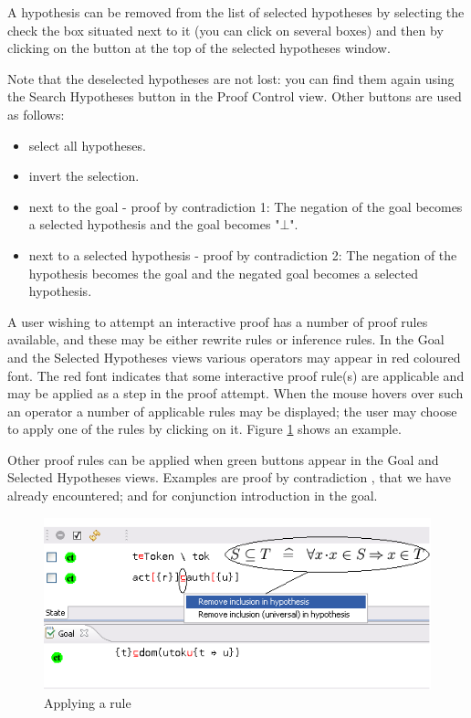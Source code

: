 A hypothesis can be removed from the list of selected hypotheses by selecting the check the box situated next to it (you can click on several boxes) and then by clicking on the  button at the top of the selected hypotheses window.

Note that the deselected hypotheses are not lost: you can find them again using the \textsf{Search Hypotheses}  button in the Proof Control view. Other buttons are used as follows:

\begin{itemize}
	\item {} select all hypotheses. 
	\item {} invert the selection. 
	\item {} next to the goal - proof by contradiction 1: The negation of the goal becomes a selected hypothesis and the goal becomes "$\bot$". 
	\item {} next to a selected hypothesis - proof by contradiction 2: The negation of the hypothesis becomes the goal and the negated goal becomes a selected hypothesis. 
\end{itemize}

A user wishing to attempt an interactive proof has a number of proof rules available, and these may be either rewrite rules or inference rules. In the \textsf{Goal} and the \textsf{Selected Hypotheses} views various operators may appear in red coloured font. The red font indicates that some interactive proof rule(s) are applicable and may be applied as a step in the proof attempt. When the mouse hovers over such an operator a number of applicable rules may be displayed; the user may choose to apply one of the rules by clicking on it. Figure \ref{fig_ref_01_proving_perspective4} shows an example.

Other proof rules can be applied when green buttons appear in the \textsf{Goal} and \textsf{Selected Hypotheses} views. Examples are proof by contradiction , that we have already encountered; and  for conjunction introduction in the goal. 

\begin{figure}[!h]
\begin{center}
	\includegraphics{img/reference/ref_01_proving_perspective4.png}
	\caption{Applying a rule}
	\label{fig_ref_01_proving_perspective4}
\end{center}
\end{figure}

